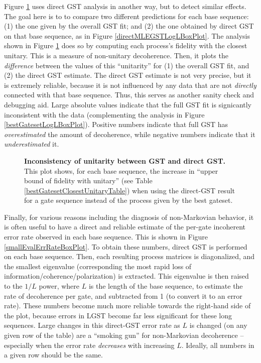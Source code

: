 {Figure \ref{directMLEGSTDeviationBoxPlot} uses direct GST analysis in another way, but to detect similar effects.   The goal here is to to compare two different predictions for each base sequence:  (1) the one given by the overall GST fit; and (2) the one obtained by direct GST on that base sequence, as in Figure \ref{directMLEGSTLogLBoxPlot}.  The analysis shown in Figure \ref{directMLEGSTDeviationBoxPlot} does so by computing each process's fidelity with the closest unitary.  This is a measure of non-unitary decoherence.  Then, it plots the \emph{difference} between the values of this ``unitarity'' for (1) the overall GST fit, and (2) the direct GST estimate.  The direct GST estimate is not very precise, but it is extremely reliable, because it is not influenced by any data that are not \emph{directly} connected with that base sequence.  Thus, this serves as another sanity check and debugging aid.  Large absolute values indicate that the full GST fit is signicantly inconsistent with the data (complementing the analysis in Figure \ref{bestGatesetLogLBoxPlot}).  Positive numbers indicate that full GST has \emph{overestimated} the amount of decoherence, while negative numbers indicate that it \emph{underestimated} it.

\begin{figure}
\begin{center}
\caption{\textbf{Inconsistency of unitarity between GST and direct GST.}  This plot shows, for each base sequence, the increase in ``upper bound of fidelity with unitary'' (see Table \ref{bestGatesetClosestUnitaryTable}) when using the direct-GST result for a gate sequence instead of the process given by the best gateset.\label{directMLEGSTDeviationBoxPlot}}
\end{center}
\end{figure}

Finally, for various reasons including the diagnosis of non-Markovian behavior, it is often useful to have a direct and reliable estimate of the per-gate incoherent error rate observed in each base sequence.  This is shown in Figure \ref{smallEvalErrRateBoxPlot}.  To obtain these numbers, direct GST is performed on each base sequence.  Then, each resulting process matrices is diagonalized, and the smallest eigenvalue (corresponding the most rapid loss of information/coherence/polarization) is extracted.  This eigenvalue is then raised to the $1/L$ power, where $L$ is the length of the base sequence, to estimate the rate of decoherence per gate, and subtracted from 1 (to convert it to an error rate).  These numbers become much more reliable towards the right-hand side of the plot, because errors in LGST become far less significant for these long sequences.  Large changes in this direct-GST error rate as $L$ is changed (on any given row of the table) are a ``smoking gun'' for non-Markovian decoherence -- especially when the error rate \emph{decreases} with increasing $L$.  Ideally, all numbers in a given row should be the same.

}
